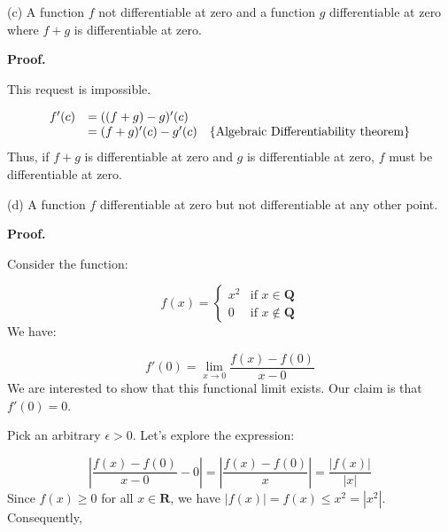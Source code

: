 \documentclass[10pt]{article}
\begin{document}
(c) A function $\displaystyle f$ not differentiable at zero and a function $\displaystyle g$ differentiable at zero where $\displaystyle f+g$ is differentiable at zero.



\textbf{Proof.}



This request is impossible.




\begin{equation*}
\begin{array}{ c l c }
f'( c) & =(( f+g) -g) '( c) & \\
 & =( f+g) '( c) -g'( c) & \left\{\text{Algebraic Differentiability theorem}\right\}
\end{array}
\end{equation*}
Thus, if $\displaystyle f+g$ is differentiable at zero and $\displaystyle g$ is differentiable at zero, $\displaystyle f$ must be differentiable at zero.



(d) A function $\displaystyle f$ differentiable at zero but not differentiable at any other point.



\textbf{Proof.}



Consider the function:


\begin{equation*}
f( x) =\begin{cases}
x^{2} & \text{if } x\in \mathbf{Q}\\
0 & \text{if } x\notin \mathbf{Q}
\end{cases}
\end{equation*}
We have:


\begin{equation*}
f'( 0) =\lim _{x\rightarrow 0}\frac{f( x) -f( 0)}{x-0}
\end{equation*}
We are interested to show that this functional limit exists. Our claim is that $\displaystyle f'( 0) =0$. 



Pick an arbitrary $\displaystyle \epsilon  >0$. Let's explore the expression:


\begin{equation*}
\left| \frac{f( x) -f( 0)}{x-0} -0\right| =\left| \frac{f( x) -f( 0)}{x}\right| =\frac{|f( x) |}{|x|}
\end{equation*}
Since $\displaystyle f( x) \geq 0$ for all $\displaystyle x\in \mathbf{R}$, we have $\displaystyle |f( x) |=f( x) \leq x^{2} =|x^{2} |$. Consequently, 
\end{document}
